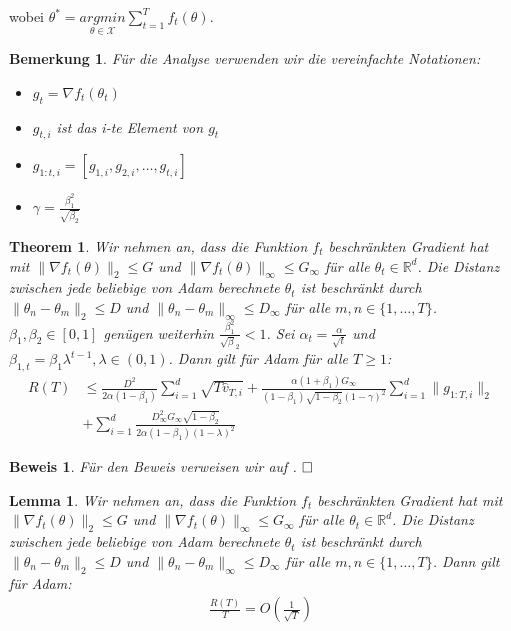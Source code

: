 \documentclass[12pt,titlepage,headsepline]{article}
\newtheorem*{theorem-non}{Theorem}
\newtheorem*{lemma-non}{Lemma}
\newtheorem*{beweis-non}{Beweis}
\newtheorem*{bemerkung*}{Bemerkung}
\begin{document}
      wobei $\theta^* = \underset{\theta \in \mathcal{X} }{argmin}  \sum_{t=1}^T f_t(\theta)$.
      \begin{bemerkung*}
        Für die Analyse verwenden wir die vereinfachte Notationen:
        \begin{itemize}
          \item $g_t = \nabla f_t(\theta_t)$
          \item $g_{t,i}$ ist das i-te Element von $g_t$
          \item $g_{1:t,i} = [g_{1,i},g_{2,i},\ldots,g_{t,i}]$
          \item $\gamma = \frac{\beta_1^2}{\sqrt{\beta_2}}$
        \end{itemize}
      \end{bemerkung*}
      \begin{theorem-non}
        \textup{
        Wir nehmen an, dass die Funktion $f_t$ beschränkten Gradient hat mit $\lVert \nabla f_t(\theta) \rVert_2 \leq G$ und $\lVert \nabla f_t(\theta) \rVert_{\infty} \leq G_{\infty}$ für alle $\theta_t \in \mathbb{R}^d$. Die Distanz zwischen jede beliebige von Adam berechnete $\theta_t$ ist beschränkt durch $\lVert \theta_n - \theta_m \rVert_2 \leq D$ und $\lVert \theta_n - \theta_m \rVert_{\infty} \leq D_{\infty}$ für alle $m, n \in \{1,\ldots,T\}$. $\beta_1, \beta_2 \in [0,1]$ genügen weiterhin $\frac{\beta_1^2}{\sqrt \beta_2} < 1$. Sei $\alpha_t = \frac{\alpha}{\sqrt t}$ und $\beta_{1,t} = \beta_1 \lambda^{t-1}, \lambda \in (0,1)$. Dann gilt für Adam für alle $T \geq 1$:
        \begin{align*}
          R(T) & \leq \frac{D^2}{2 \alpha (1-\beta_1)} \sum_{i=1}^d \sqrt{T \hat{v}_{T,i}}+ \frac{\alpha (1+\beta_1)G_{\infty}}{(1-\beta_1)\sqrt{1-\beta_2}(1-\gamma)^2} \sum_{i=1}^d \lVert g_{1:T,i} \rVert_2 \\
          & + \sum_{i=1}^d \frac{D^2_{\infty}G_{\infty}\sqrt{1-\beta_2}}{2 \alpha (1-\beta_1)(1-\lambda)^2}
        \end{align*}
        }
      \end{theorem-non}
      \begin{beweis-non}
        \textup{
        Für den Beweis verweisen wir auf \cite{kingma_adam_2017, Theorem 5}.
        $\hfill\Box$
        }
      \end{beweis-non}
      \begin{lemma-non}
        \textup{
        Wir nehmen an, dass die Funktion $f_t$ beschränkten Gradient hat mit $\lVert \nabla f_t(\theta) \rVert_2 \leq G$ und $\lVert \nabla f_t(\theta) \rVert_{\infty} \leq G_{\infty}$ für alle $\theta_t \in \mathbb{R}^d$. Die Distanz zwischen jede beliebige von Adam berechnete $\theta_t$ ist beschränkt durch $\lVert \theta_n - \theta_m \rVert_2 \leq D$ und $\lVert \theta_n - \theta_m \rVert_{\infty} \leq D_{\infty}$ für alle $m, n \in \{1,\ldots,T\}$. Dann gilt für Adam:
        \begin{align*}
          \frac{R(T)}{T} = O(\frac{1}{\sqrt T})
        \end{align*}
        }
      \end{lemma-non}
\end{document}
